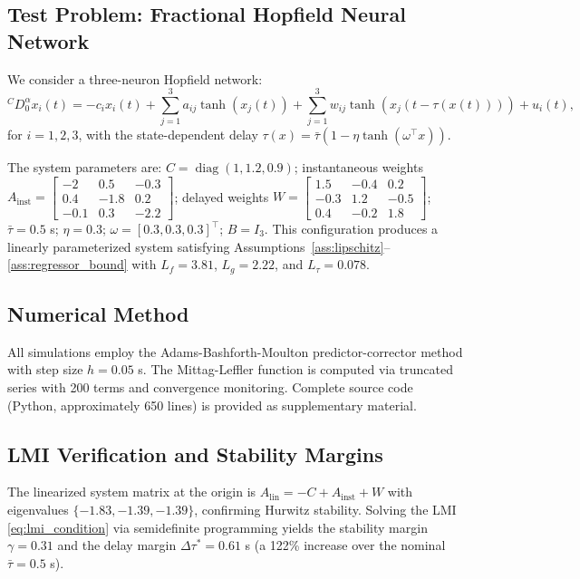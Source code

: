 \documentclass[12pt,a4paper]{article}
\DeclareMathOperator{\diag}{diag}
\begin{document}
\subsection{Test Problem: Fractional Hopfield Neural Network}

We consider a three-neuron Hopfield network:
\begin{equation}
\label{eq:hopfield}
{}^{C}\!D^{\alpha}_{0} x_i(t) = -c_i x_i(t) + \sum_{j=1}^{3} a_{ij} \tanh(x_j(t)) + \sum_{j=1}^{3} w_{ij} \tanh(x_j(t-\tau(x(t)))) + u_i(t),
\end{equation}
for $i = 1, 2, 3$, with the state-dependent delay $\tau(x) = \bar{\tau}(1 - \eta \tanh(\omega^{\!\top} x))$.

The system parameters are: $C = \diag(1, 1.2, 0.9)$; instantaneous weights $A_{\text{inst}} = \left[\begin{smallmatrix} -2 & 0.5 & -0.3 \\ 0.4 & -1.8 & 0.2 \\ -0.1 & 0.3 & -2.2 \end{smallmatrix}\right]$; delayed weights $W = \left[\begin{smallmatrix} 1.5 & -0.4 & 0.2 \\ -0.3 & 1.2 & -0.5 \\ 0.4 & -0.2 & 1.8 \end{smallmatrix}\right]$; $\bar{\tau} = 0.5$ s; $\eta = 0.3$; $\omega = [0.3, 0.3, 0.3]^{\!\top}$; $B = I_3$. This configuration produces a linearly parameterized system satisfying Assumptions~\ref{ass:lipschitz}--\ref{ass:regressor_bound} with $L_f = 3.81$, $L_g = 2.22$, and $L_{\tau} = 0.078$.

\subsection{Numerical Method}

All simulations employ the Adams-Bashforth-Moulton predictor-corrector method \cite{diethelm2002} with step size $h = 0.05$ s. The Mittag-Leffler function is computed via truncated series with 200 terms and convergence monitoring. Complete source code (Python, approximately 650 lines) is provided as supplementary material.

\subsection{LMI Verification and Stability Margins}

The linearized system matrix at the origin is $A_{\text{lin}} = -C + A_{\text{inst}} + W$ with eigenvalues $\{-1.83, -1.39, -1.39\}$, confirming Hurwitz stability. Solving the LMI \eqref{eq:lmi_condition} via semidefinite programming yields the stability margin $\gamma = 0.31$ and the delay margin $\Delta\tau^* = 0.61$ s (a 122\% increase over the nominal $\bar{\tau} = 0.5$ s).
\end{document}
